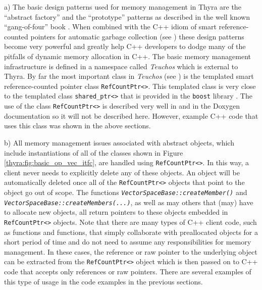 \documentclass[pdf,ps2pdf,11pt]{SANDreport}
\begin{document}
a) The basic design patterns used for memory management in Thyra are
the ``abstract factory'' and the ``prototype'' patterns as described
in the well known ``gang-of-four'' book {}\cite{ref:gama_et_al_1995}.
When combined with the C++ idiom of smart reference-counted pointers
for automatic garbage collection (see {}\cite[Items
28-29]{ref:meyers_1996}) these design patterns become very powerful
and greatly help C++ developers to dodge many of the pitfalls of
dynamic memory allocation in C++.  The basic memory management
infrastructure is defined in a namespace called {}\textit{Teuchos}
which is external to Thyra.  By far the most important class in
{}\textit{Teuchos} (see {}\cite{ref:moochodevguide}) is the templated
smart reference-counted pointer class {}\texttt{RefCountPtr<>}.  This
templated class is very close to the templated class
{}\texttt{shared\_ptr<>} that is provided in the {}\texttt{boost}
library {}\cite{ref:boost}.  The use of the class
{}\texttt{RefCountPtr<>} is described very well in
{}\cite{ref:RefCountPtr} and in the Doxygen documentation so it will
not be described here.  However, example C++ code that uses this class
was shown in the above sections.

b) All memory management issues associated with abstract objects, which
include instantiations of all of the classes shown in Figure
{}\ref{thyra:fig:basic_op_vec_itfc}, are handled using
{}\texttt{RefCountPtr<>}.  In this way, a client never needs to
explicitly delete any of these objects.  An object will be
automatically deleted once all of the {}\texttt{RefCountPtr<>} objects
that point to the object go out of scope.  The functions
{}\texttt{\textit{Vector\-Space\-Base\-::createMember()}} and
{}\texttt{\textit{Vector\-Space\-Base\-::createMembers(...)}}, as well as may
others that (may) have to allocate new objects, all return pointers to
these objects embedded in {}\texttt{RefCountPtr<>} objects.  Note that
there are many types of C++ client code, such as functions and
functions, that simply collaborate with preallocated objects for a short
period of time and do not need to assume any responsibilities for
memory management.  In these cases, the reference or raw pointer to
the underlying object can be extracted from the
{}\texttt{RefCountPtr<>} object which is then passed on to C++ code
that accepts only references or raw pointers.  There are several
examples of this type of usage in the code examples in the previous
sections.
\end{document}
